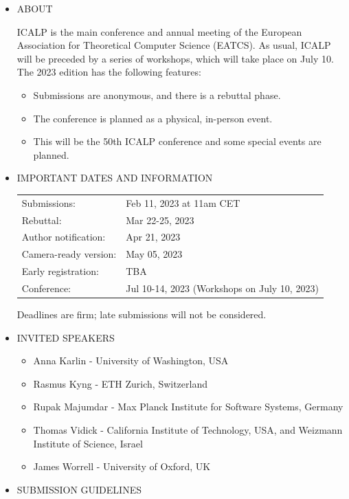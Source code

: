 \documentclass[prodmode,acmtecs]{acmsmall} %
\begin{document}
\begin{itemize}\item  ABOUT 
 
  ICALP is the main conference and annual meeting of the European Association for Theoretical Computer Science (EATCS). As usual, ICALP will be preceded by a series of workshops, which will take place on July 10. The 2023 edition has the following features: 
 
\begin{itemize}\item  Submissions are anonymous, and there is a rebuttal phase.
\item  The conference is planned as a physical, in-person event.
\item  This will be the 50th ICALP conference and some special events are planned.
\end{itemize} 
\item  IMPORTANT DATES AND INFORMATION 
 
\begin{tabulary}{\linewidth}{LL}Submissions:  & Feb 11, 2023 at 11am CET \\
Rebuttal:  & Mar 22-25, 2023 \\
Author notification:  & Apr 21, 2023 \\
Camera-ready version:  & May 05, 2023 \\
Early registration:  & TBA \\
Conference:  & Jul 10-14, 2023 (Workshops on July 10, 2023) \\
\end{tabulary}
 
  Deadlines are firm; late submissions will not be considered. 
 
\item  INVITED SPEAKERS 
 
\begin{itemize}\item  Anna Karlin - University of Washington, USA
\item  Rasmus Kyng - ETH Zurich, Switzerland
\item  Rupak Majumdar - Max Planck Institute for Software Systems, Germany
\item  Thomas Vidick - California Institute of Technology, USA, and Weizmann Institute of Science, Israel
\item  James Worrell - University of Oxford, UK
\end{itemize} 
\item  SUBMISSION GUIDELINES 
 

\end{itemize}
\end{document}
